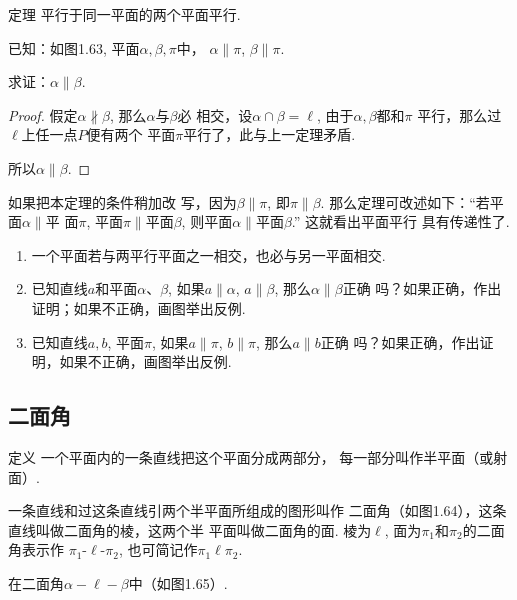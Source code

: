 \begin{blk}
  {定理} 平行于同一平面的两个平面平行. 
\end{blk}


已知：如图1.63, 平面$\alpha,\beta,\pi$中，
$\alpha\parallel \pi$, $\beta\parallel \pi$.

求证：$\alpha\parallel \beta$.

\begin{proof}
  假定$\alpha\nparallel\beta$, 那么$\alpha$与$\beta$必
相交，设$\alpha\cap \beta=\ell$, 由于$\alpha,\beta$都和$\pi$
平行，那么过$\ell$上任一点$P$便有两个
平面$\pi$平行了，此与上一定理矛盾. 

所以$\alpha\parallel \beta$.
\end{proof}

\begin{rmk}
如果把本定理的条件稍加改
写，因为$\beta\parallel \pi$, 即$\pi\parallel \beta$. 那么定理可改述如下：“若平面$\alpha\parallel$平
面$\pi$, 平面$\pi\parallel$平面$\beta$, 则平面$\alpha\parallel$平面$\beta$.” 这就看出平面平行
具有传递性了. 
\end{rmk}

\begin{ex}
\begin{enumerate}
  \item 一个平面若与两平行平面之一相交，也必与另一平面相交.
  \item 已知直线$a$和平面$\alpha$、$\beta$, 如果$a\parallel \alpha$, $a\parallel \beta$, 那么$\alpha\parallel \beta$正确
  吗？如果正确，作出证明；如果不正确，画图举出反例. 
  \item 已知直线$a,b$, 平面$\pi$, 如果$a\parallel \pi$, $b\parallel \pi$, 那么$a\parallel b$正确
  吗？如果正确，作出证明，如果不正确，画图举出反例.
\end{enumerate}
\end{ex}

\subsection{二面角}
\begin{blk}
  {定义} 一个平面内的一条直线把这个平面分成两部分，
每一部分叫作半平面（或射面）. 
\end{blk}

一条直线和过这条直线引两个半平面所组成的图形叫作
二面角（如图1.64），这条直线叫做二面角的棱，这两个半
平面叫做二面角的面. 棱为$\ell$, 面为$\pi_1$和$\pi_2$的二面角表示作
$\pi_1$-$\ell$-$\pi_2$, 也可简记作$\pi_1\ell\pi_2$.

在二面角$\alpha-\ell-\beta$中（如图1.65）.

